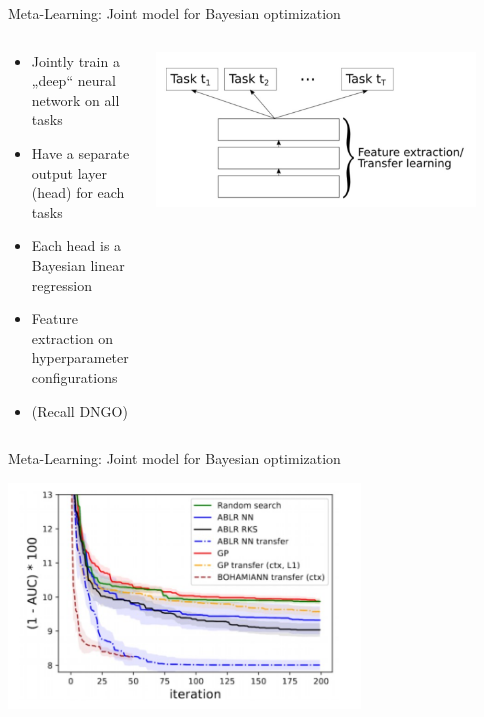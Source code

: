 \begin{frame}[c]{Meta-Learning: Joint model for Bayesian optimization}

\begin{columns}[T] %
\begin{column}{.38\textwidth}

\begin{itemize}
    \item<1-5> Jointly train a „deep“ neural network on all tasks 
    \item<2-5> Have a separate output layer (head) for each tasks 
    \item<3-5> Each head is a Bayesian linear regression 
    \item<4-5> Feature extraction on hyperparameter configurations 
    \item<5-5> (Recall DNGO)
\end{itemize}
\end{column}%

\hfill%

\begin{column}{.58\textwidth}
\includegraphics[width=0.9\textwidth]{w07_hpo_grey_box/images/meta_learning/perrone_int.jpg}
\end{column}%
\end{columns}


\end{frame}
\begin{frame}[c]{Meta-Learning: Joint model for Bayesian optimization}
	
\centering
\includegraphics[width=0.7\textwidth]{w07_hpo_grey_box/images/meta_learning/perrone_res.jpg}

\end{frame}
